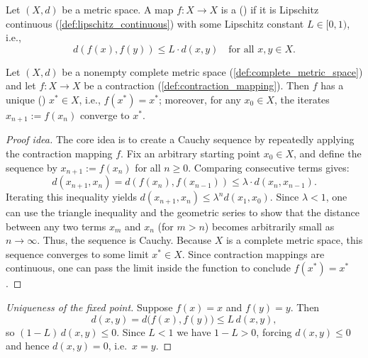 \begin{definition}
\label{def:contraction_mapping}
Let $(X,d)$ be a metric space. A map $f : X \to X$ is a 
() if it is Lipschitz continuous (\cref{def:lipschitz_continuous}) with
some Lipschitz constant $L \in [0,1)$, i.e.,
\[d(f(x),f(y)) \leq L \cdot d(x,y) \quad \text{for all } x,y \in X.\]
\end{definition}

\begin{theorem}
\label{thm:banach_fixed_point}
Let $(X,d)$ be a nonempty complete metric space (\cref{def:complete_metric_space}) and let
$f : X \to X$ be a contraction (\cref{def:contraction_mapping}). Then $f$ has a unique
 () $x^* \in X$, i.e., $f(x^*) = x^*$; moreover, for any
$x_0 \in X$, the iterates $x_{n+1} := f(x_n)$ converge to $x^*$.
\end{theorem}

\begin{proof}[Proof idea]
The core idea is to create a Cauchy sequence by repeatedly applying the contraction mapping $f$.
Fix an arbitrary starting point $x_0 \in X$, and define the sequence by $x_{n+1} := f(x_n)$ for all $n \geq 0$.
Comparing consecutive terms gives:
\[
d(x_{n+1}, x_n) = d(f(x_n), f(x_{n-1})) \leq \lambda \cdot d(x_n, x_{n-1}).
\]
Iterating this inequality yields $d(x_{n+1}, x_n) \leq \lambda^n d(x_1, x_0)$. Since $\lambda < 1$, one can use the triangle inequality and the geometric series to show that the distance between any two terms $x_m$ and $x_n$ (for $m > n$) becomes arbitrarily small as $n \to \infty$. Thus, the sequence is Cauchy.
Because $X$ is a complete metric space, this sequence converges to some limit $x^* \in X$. Since contraction mappings are continuous, one can pass the limit inside the function to conclude $f(x^*) = x^*$.
\end{proof}

\begin{proof}[Uniqueness of the fixed point]
Suppose $f(x) = x$ and $f(y) = y$. Then
\[d(x,y) = d\big(f(x),f(y)\big) \leq L\,d(x,y),\]
so $(1-L)\,d(x,y) \leq 0$. Since $L<1$ we have $1-L>0$, forcing $d(x,y) \leq 0$ and hence
$d(x,y)=0$, i.e.\ $x=y$.
\end{proof}

